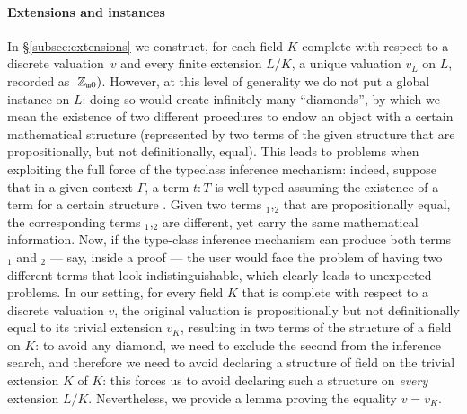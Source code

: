 \documentclass[sigplan,screen]{acmart}
\begin{document}
\paragraph{Extensions and  instances}
In \S\ref{subsec:extensions} we construct, for each field $K$ complete with respect to a discrete valuation~$v$ and every finite extension $L/K$, a unique valuation $v_L$ on $L$, recorded as $\;\mathbb{Z}_{\mathtt{m}0})$. However, at this level of generality we do not put a global  instance on $L$: doing so would create infinitely many ``diamonds'', by which we mean the existence of two different procedures to endow an object with a certain mathematical structure (represented by two terms of the given structure that are propositionally, but not definitionally, equal). This leads to problems when exploiting the full force of the typeclass inference mechanism: indeed, suppose that in a given context $\Gamma$, a term $t:T$ is well-typed assuming the existence of a term  for a certain structure . Given two terms $_1$,$_2$ that are propositionally equal, the corresponding terms $_1$,$_2$ are different, yet carry the same mathematical information. Now, if the type-class inference mechanism can produce both terms $_1$ and $_2$ --- say, inside a proof --- the user would face the problem of having two different terms that look indistinguishable, which clearly leads to unexpected problems. In our setting, for every field $K$ that is complete with respect to a discrete valuation $v$, the original valuation is propositionally but not definitionally equal to its trivial extension $v_K$, resulting in two terms of the structure of a  field on $K$: to avoid any diamond, we need to exclude the second from the inference search, and therefore we need to avoid declaring a structure of  field on the trivial extension $K$ of $K$: this forces us to avoid declaring such a structure on \emph{every} extension $L/K$. Nevertheless, we provide a lemma \href{https://github.com/mariainesdff/local_fields_journal/blob/0b408ff3af36e18f991f9d4cb87be3603cfc3fc3/src/discrete_valuation_ring/trivial_extension.lean#L63}{\extlink} proving the equality $v=v_K$.
\end{document}
